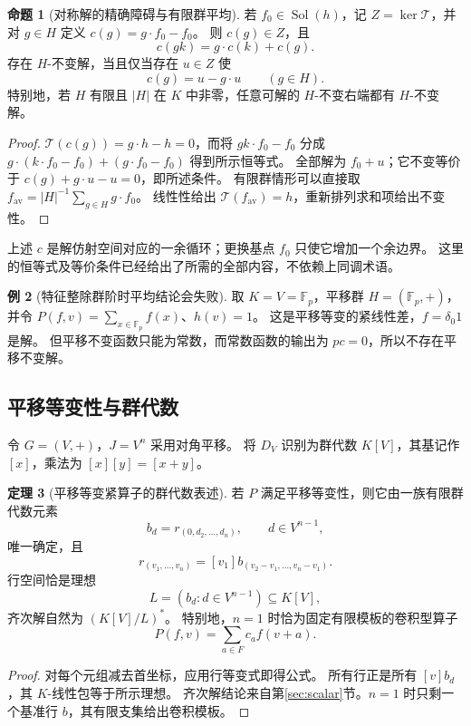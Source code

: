 \documentclass[UTF8,11pt,a4paper]{ctexart}
\theoremstyle{definition}
\newtheorem{theorem}{定理}[section]
\newtheorem{proposition}[theorem]{命题}
\newtheorem{example}[theorem]{例}
\newcommand{\T}{\mathcal T}
\newcommand{\Sol}{\operatorname{Sol}}
\numberwithin{equation}{section}
\begin{document}
\begin{proposition}[对称解的精确障碍与有限群平均]\label{prop:symmetric}
若 $f_0\in\Sol(h)$，记 $Z=\ker\T$，并对 $g\in H$ 定义
$c(g)=g\cdot f_0-f_0$。
则 $c(g)\in Z$，且
\[
 c(gk)=g\cdot c(k)+c(g).
\]
存在 $H$-不变解，当且仅当存在 $u\in Z$ 使
\[
 c(g)=u-g\cdot u\qquad(g\in H).
\]
特别地，若 $H$ 有限且 $|H|$ 在 $K$ 中非零，任意可解的 $H$-不变右端都有 $H$-不变解。
\end{proposition}
\begin{proof}
$\T(c(g))=g\cdot h-h=0$，而将 $gk\cdot f_0-f_0$ 分成
$g\cdot(k\cdot f_0-f_0)+(g\cdot f_0-f_0)$ 得到所示恒等式。
全部解为 $f_0+u$；它不变等价于 $c(g)+g\cdot u-u=0$，即所述条件。
有限群情形可以直接取
$f_{\mathrm{av}}=|H|^{-1}\sum_{g\in H}g\cdot f_0$。
线性性给出 $\T(f_{\mathrm{av}})=h$，重新排列求和项给出不变性。
\end{proof}
上述 $c$ 是解仿射空间对应的一余循环；更换基点 $f_0$ 只使它增加一个余边界。
这里的恒等式及等价条件已经给出了所需的全部内容，不依赖上同调术语。

\begin{example}[特征整除群阶时平均结论会失败]
取 $K=V=\mathbb F_p$，平移群 $H=(\mathbb F_p,+)$，并令
$P(f,v)=\sum_{x\in\mathbb F_p}f(x)$、$h(v)=1$。
这是平移等变的紧线性差，$f=\delta_0 1$ 是解。
但平移不变函数只能为常数，而常数函数的输出为 $p c=0$，所以不存在平移不变解。
\end{example}

\subsection{平移等变性与群代数}
令 $G=(V,+)$，$J=V^n$ 采用对角平移。
将 $D_V$ 识别为群代数 $K[V]$，其基记作 $[x]$，乘法为 $[x][y]=[x+y]$。
\begin{theorem}[平移等变紧算子的群代数表述]\label{thm:translation}
若 $P$ 满足平移等变性，则它由一族有限群代数元素
\[
 b_d=r_{(0,d_2,\ldots,d_n)},\qquad d\in V^{n-1},
\]
唯一确定，且
\[
 r_{(v_1,\ldots,v_n)}=[v_1]b_{(v_2-v_1,\ldots,v_n-v_1)}.
\]
行空间恰是理想
\[
 L=(b_d:d\in V^{n-1})\subseteq K[V],
\]
齐次解自然为 $(K[V]/L)^*$。
特别地，$n=1$ 时恰为固定有限模板的卷积型算子
\[
 P(f,v)=\sum_{a\in F}c_a f(v+a).
\]
\end{theorem}
\begin{proof}
对每个元组减去首坐标，应用行等变式即得公式。
所有行正是所有 $[v]b_d$，其 $K$-线性包等于所示理想。
齐次解结论来自第\ref{sec:scalar}节。$n=1$ 时只剩一个基准行 $b$，其有限支集给出卷积模板。
\end{proof}
\end{document}

